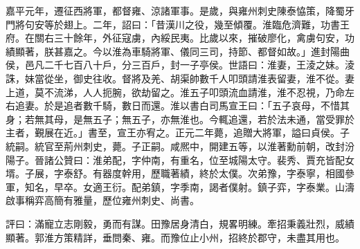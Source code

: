 \begin{pinyinscope}
嘉平元年，遷征西將軍，都督雍、涼諸軍事。是歲，與雍州刺史陳泰恊策，降蜀牙門將句安等於翅上。二年，詔曰：「昔漢川之役，幾至傾覆。淮臨危濟難，功書王府。在關右三十餘年，外征寇虜，內綏民夷。比歲以來，摧破廖化，禽虜句安，功績顯著，朕甚嘉之。今以淮為車騎將軍、儀同三司，持節、都督如故。」進封陽曲侯，邑凡二千七百八十戶，分三百戶，封一子亭侯。世語曰：淮妻，王淩之妹。淩誅，妹當從坐，御史往收。督將及羌、胡渠帥數千人叩頭請淮表留妻，淮不從。妻上道，莫不流涕，人人扼腕，欲劫留之。淮五子叩頭流血請淮，淮不忍視，乃命左右追妻。於是追者數千騎，數日而還。淮以書白司馬宣王曰：「五子哀母，不惜其身；若無其母，是無五子；無五子，亦無淮也。今輒追還，若於法未通，當受罪於主者，覲展在近。」書至，宣王亦宥之。正元二年薨，追贈大將軍，謚曰貞侯。子統嗣。統官至荊州刺史，薨。子正嗣。咸熈中，開建五等，以淮著勳前朝，改封汾陽子。晉諸公贊曰：淮弟配，字仲南，有重名，位至城陽太守。裴秀、賈充皆配女壻。子展，字泰舒。有器度幹用，歷職著績，終於太僕。次弟豫，字泰寧，相國參軍，知名，早卒。女適王衍。配弟鎮，字季南，謁者僕射。鎮子弈，字泰業。山濤啟事稱弈高簡有雅量，歷位雍州刺史、尚書。

評曰：滿寵立志剛毅，勇而有謀。田豫居身清白，規畧明練。牽招秉義壯烈，威績顯著。郭淮方策精詳，垂問秦、雍。而豫位止小州，招終於郡守，未盡其用也。


\end{pinyinscope}
